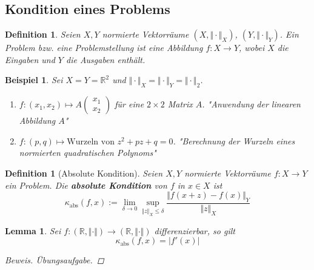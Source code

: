 \documentclass[12pt]{article}
\theoremstyle{break}
\newtheorem{lemma}[theorem]{Lemma}
\newtheorem{definition}[theorem]{Definition}
\newtheorem{example}[theorem]{Beispiel}
\begin{document}
\subsection{Kondition eines Problems}

\begin{definition}
Seien $X,Y$ normierte Vektorräume $(X, \Vert \cdot \Vert_X)$, $(Y, \Vert \cdot \Vert_Y)$. Ein Problem bzw. eine Problemstellung ist eine Abbildung $f:X \rightarrow Y$, wobei $X$ die Eingaben und $Y$ die Ausgaben enthält.
\end{definition}

\begin{example}
Sei $X = Y = \mathbb{R}^2$ und $\Vert \cdot \Vert_X = \Vert \cdot \Vert_Y = \Vert \cdot \Vert_2$.
\begin{enumerate}
  \item[i)] $f: (x_1, x_2) \mapsto A \left(\begin{matrix} x_1 \\x_2 \end{matrix} \right)$ für eine $2 \times 2$ Matrix $A$. "Anwendung der linearen Abbildung $A$"
  \item[ii)] $f: (p,q) \mapsto \text{Wurzeln von $z^2 + pz + q = 0$}$. "Berechnung der Wurzeln eines normierten quadratischen Polynoms"
\end{enumerate}
\end{example}

\begin{definition}[Absolute Kondition]
Seien $X, Y$ normierte Vektorräume $f: X \rightarrow Y$ ein Problem. Die \textbf{absolute Kondition} von $f$ in $x \in X$ ist 
$$\kappa_{\text{abs}}(f,x) := \lim_{\delta \rightarrow 0} \sup_{\Vert z \Vert_X \leq \delta} \frac{\Vert f(x+z) - f(x) \Vert_Y}{\Vert z \Vert_X} $$
\end{definition}

\begin{lemma}
Sei $f: (\mathbb{R}, \Vert \cdot \Vert) \rightarrow (\mathbb{R}, \Vert \cdot \Vert)$ differenzierbar, so gilt
$$\kappa_{\text{abs}}(f,x) = \vert f'(x) \vert$$
\begin{proof}[Beweis]
Übungsaufgabe.
\end{proof}
\end{lemma}
\end{document}
